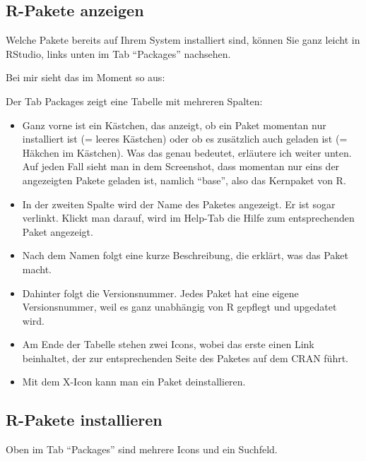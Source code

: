\documentclass[
]{book}
\begin{document}
\hypertarget{r-pakete-anzeigen}{%
\subsection{R-Pakete anzeigen}\label{r-pakete-anzeigen}}

Welche Pakete bereits auf Ihrem System installiert sind, können Sie ganz leicht in RStudio, links unten im Tab ``Packages'' nachsehen.

Bei mir sieht das im Moment so aus:

Der Tab Packages zeigt eine Tabelle mit mehreren Spalten:

\begin{itemize}
\item
  Ganz vorne ist ein Kästchen, das anzeigt, ob ein Paket momentan nur installiert ist (= leeres Kästchen) oder ob es zusätzlich auch geladen ist (= Häkchen im Kästchen). Was das genau bedeutet, erläutere ich weiter unten. Auf jeden Fall sieht man in dem Screenshot, dass momentan nur eins der angezeigten Pakete geladen ist, namlich ``base'', also das Kernpaket von R.
\item
  In der zweiten Spalte wird der Name des Paketes angezeigt. Er ist sogar verlinkt. Klickt man darauf, wird im Help-Tab die Hilfe zum entsprechenden Paket angezeigt.
\item
  Nach dem Namen folgt eine kurze Beschreibung, die erklärt, was das Paket macht.
\item
  Dahinter folgt die Versionsnummer. Jedes Paket hat eine eigene Versionsnummer, weil es ganz unabhängig von R gepflegt und upgedatet wird.
\item
  Am Ende der Tabelle stehen zwei Icons, wobei das erste einen Link beinhaltet, der zur entsprechenden Seite des Paketes auf dem CRAN führt.
\item
  Mit dem X-Icon kann man ein Paket deinstallieren.
\end{itemize}

\hypertarget{r-pakete-installieren}{%
\subsection{R-Pakete installieren}\label{r-pakete-installieren}}

Oben im Tab ``Packages'' sind mehrere Icons und ein Suchfeld.
\end{document}
